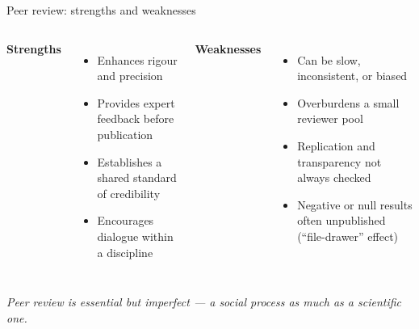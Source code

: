 \documentclass[aspectratio=169]{beamer}
\begin{document}
\begin{frame}{Peer review: strengths and weaknesses}
\begin{columns}[T]
\textbf{Strengths}
\begin{itemize}
  \item Enhances rigour and precision
  \item Provides expert feedback before publication
  \item Establishes a shared standard of credibility
  \item Encourages dialogue within a discipline
\end{itemize}

\textbf{Weaknesses}
\begin{itemize}
  \item Can be slow, inconsistent, or biased
  \item Overburdens a small reviewer pool
  \item Replication and transparency not always checked
  \item Negative or null results often unpublished (``file-drawer'' effect)
\end{itemize}
\end{columns}
\medskip
\textit{Peer review is essential but imperfect — a social process as much as a scientific one.}
\end{frame}
\end{document}
